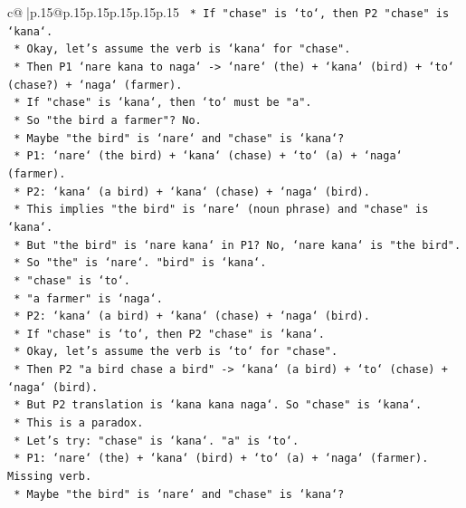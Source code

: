 \documentclass{article}
\begin{document}
{\begin{supertabular}{c@{$\;$}|p{.15\linewidth}@{}p{.15\linewidth}p{.15\linewidth}p{.15\linewidth}p{.15\linewidth}p{.15\linewidth}}
{{{\texttt{            *   If "chase" is `to`, then P2 "chase" is `kana`.} \\
\texttt{            *   Okay, let's assume the verb is `kana` for "chase".} \\
\texttt{            *   Then P1 `nare kana to naga` {-}> `nare` (the) + `kana` (bird) + `to` (chase?) + `naga` (farmer).} \\
\texttt{            *   If "chase" is `kana`, then `to` must be "a".} \\
\texttt{            *   So "the bird a farmer"? No.} \\
\texttt{            *   Maybe "the bird" is `nare` and "chase" is `kana`?} \\
\texttt{            *   P1: `nare` (the bird) + `kana` (chase) + `to` (a) + `naga` (farmer).} \\
\texttt{            *   P2: `kana` (a bird) + `kana` (chase) + `naga` (bird).} \\
\texttt{            *   This implies "the bird" is `nare` (noun phrase) and "chase" is `kana`.} \\
\texttt{            *   But "the bird" is `nare kana` in P1? No, `nare kana` is "the bird".} \\
\texttt{            *   So "the" is `nare`. "bird" is `kana`.} \\
\texttt{            *   "chase" is `to`.} \\
\texttt{            *   "a farmer" is `naga`.} \\
\texttt{            *   P2: `kana` (a bird) + `kana` (chase) + `naga` (bird).} \\
\texttt{            *   If "chase" is `to`, then P2 "chase" is `kana`.} \\
\texttt{            *   Okay, let's assume the verb is `to` for "chase".} \\
\texttt{            *   Then P2 "a bird chase a bird" {-}> `kana` (a bird) + `to` (chase) + `naga` (bird).} \\
\texttt{            *   But P2 translation is `kana kana naga`. So "chase" is `kana`.} \\
\texttt{            *   This is a paradox.} \\
\texttt{            *   Let's try: "chase" is `kana`. "a" is `to`.} \\
\texttt{            *   P1: `nare` (the) + `kana` (bird) + `to` (a) + `naga` (farmer). Missing verb.} \\
\texttt{            *   Maybe "the bird" is `nare` and "chase" is `kana`?} \\
}}}
\end{supertabular}}
\end{document}
